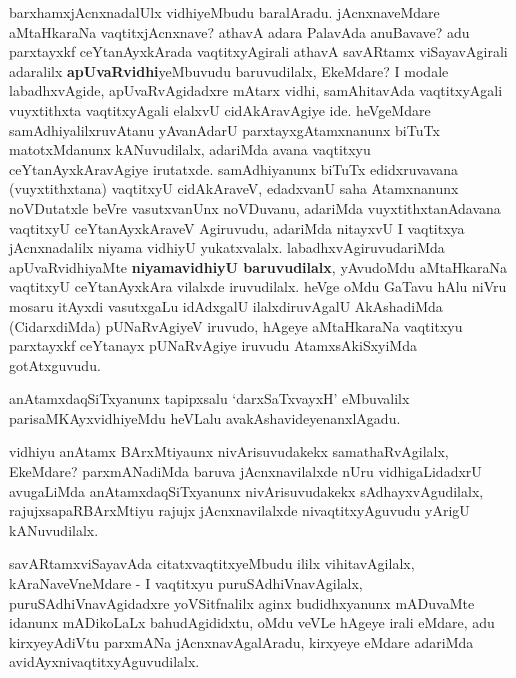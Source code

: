 \centerline{}

\begin{artha}
barxhamxjAcnxnadalUlx vidhiyeMbudu baralAradu. jAcnxnaveMdare aMtaHkaraNa
vaqtitxjAcnxnave? athavA adara PalavAda anuBavave? adu
parxtayxkf ceYtanAyxkArada vaqtitxyAgirali athavA savARtamx
viSayavAgirali adaralilx \textbf{apUvaRvidhi}yeMbuvudu baruvudilalx,
EkeMdare? I modale labadhxvAgide, apUvaRvAgidadxre mAtarx vidhi,
samAhitavAda vaqtitxyAgali vuyxtithxta vaqtitxyAgali elalxvU
cidAkAravAgiye ide. heVgeMdare samAdhiyalilxruvAtanu yAvanAdarU
parxtayxgAtamxnanunx biTuTx matotxMdanunx kANuvudilalx, adariMda avana
vaqtitxyu ceYtanAyxkAravAgiye irutatxde. samAdhiyanunx biTuTx
edidxruvavana (vuyxtithxtana) vaqtitxyU cidAkAraveV, edadxvanU saha
Atamxnanunx noVDutatxle beVre vasutxvanUnx noVDuvanu, adariMda
vuyxtithxtanAdavana vaqtitxyU ceYtanAyxkAraveV Agiruvudu, adariMda
nitayxvU I vaqtitxya jAcnxnadalilx niyama vidhiyU yukatxvalalx.
labadhxvAgiruvudariMda apUvaRvidhiyaMte
\textbf{niyamavidhiyU baruvudilalx}, yAvudoMdu aMtaHkaraNa vaqtitxyU
ceYtanAyxkAra vilalxde iruvudilalx. heVge oMdu GaTavu hAlu niVru mosaru
itAyxdi vasutxgaLu idAdxgalU ilalxdiruvAgalU AkAshadiMda (CidarxdiMda)
pUNaRvAgiyeV iruvudo, hAgeye aMtaHkaraNa vaqtitxyu parxtayxkf
ceYtanayx pUNaRvAgiye iruvudu AtamxsAkiSxyiMda gotAtxguvudu.
\end{artha}

\centerline{}

\begin{artha}
anAtamxdaqSiTxyanunx tapipxsalu `darxSaTxvayxH' eMbuvalilx
parisaMKAyxvidhiyeMdu heVLalu avakAshavideyenanxlAgadu.

vidhiyu anAtamx BArxMtiyaunx nivArisuvudakekx samathaRvAgilalx,
EkeMdare? parxmANadiMda baruva jAcnxnavilalxde nUru vidhigaLidadxrU
avugaLiMda anAtamxdaqSiTxyanunx nivArisuvudakekx sAdhayxvAgudilalx,
rajujxsapaRBArxMtiyu rajujx jAcnxnavilalxde nivaqtitxyAguvudu yArigU kANuvudilalx.
\end{artha}

\begin{artha}
savARtamxviSayavAda citatxvaqtitxyeMbudu ililx vihitavAgilalx,
kAraNaveVneMdare - I vaqtitxyu puruSAdhiVnavAgilalx,
puruSAdhiVnavAgidadxre yoVSitfnalilx aginx budidhxyanunx mADuvaMte
idanunx mADikoLaLx bahudAgididxtu, oMdu veVLe hAgeye irali eMdare,
adu kirxyeyAdiVtu parxmANa jAcnxnavAgalAradu, kirxyeye eMdare adariMda avidAyxnivaqtitxyAguvudilalx.
\end{artha}

